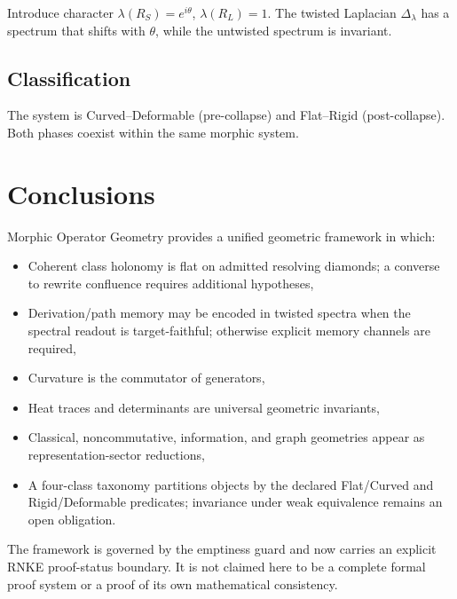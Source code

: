 \documentclass[12pt, oneside]{article}
\begin{document}
Introduce character $\lambda(R_S) = e^{i\theta}$, $\lambda(R_L) = 1$. The twisted Laplacian $\Delta_\lambda$ has a spectrum that shifts with $\theta$, while the untwisted spectrum is invariant.

\subsection{Classification}

The system is Curved--Deformable (pre-collapse) and Flat--Rigid (post-collapse). Both phases coexist within the same morphic system.

\section{Conclusions}

Morphic Operator Geometry provides a unified geometric framework in which:
\begin{itemize}
    \item Coherent class holonomy is flat on admitted resolving diamonds; a converse to rewrite confluence requires additional hypotheses,
    \item Derivation/path memory may be encoded in twisted spectra when the spectral readout is target-faithful; otherwise explicit memory channels are required,
    \item Curvature is the commutator of generators,
    \item Heat traces and determinants are universal geometric invariants,
    \item Classical, noncommutative, information, and graph geometries appear as representation-sector reductions,
    \item A four-class taxonomy partitions objects by the declared Flat/Curved and Rigid/Deformable predicates; invariance under weak equivalence remains an open obligation.
\end{itemize}

The framework is governed by the emptiness guard and now carries an explicit RNKE proof-status boundary. It is not claimed here to be a complete formal proof system or a proof of its own mathematical consistency.

\begin{center}
\end{center}
\end{document}
